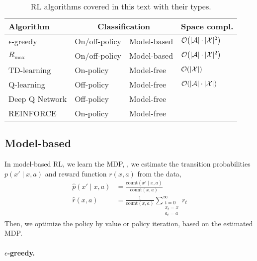 \begin{table}[t]
  \caption{RL algorithms covered in this text with their types.}
  \label{tab:rl-algos}
  \centering
  \begin{tabular}[c]{llll}
    \toprule
    \textbf{Algorithm} & \multicolumn{2}{c}{\textbf{Classification}} & \textbf{Space compl.} \\
    \midrule
    $\epsilon$-greedy & On/off-policy & Model-based & $\bigo{|\mathcal{A}| \cdot |\X|^2}$ \\
    $R_{\max}$ & On/off-policy & Model-based & $\bigo{|\mathcal{A}| \cdot |\X|^2}$ \\
    TD-learning & On-policy & Model-free & $\bigo{|\X|}$ \\
    Q-learning & Off-policy & Model-free & $\bigo{|\mathcal{A}| \cdot |\X|}$ \\
    Deep Q Network & Off-policy & Model-free \\
    REINFORCE & On-policy & Model-free \\
    \bottomrule
  \end{tabular}
\end{table}

\subsection{Model-based}

In model-based RL, we learn the MDP, \ie, we estimate the transition
probabilities $p(x'\mid x,a)$ and reward function $r(x,a)$ from the data,
\begin{align*}
  \hat{p}(x'\mid x, a) &= \frac{\mathrm{count}(x' \mid x, a)}{\mathrm{count}(x, a)} \\
  \hat{r}(x, a) &= \frac{1}{\mathrm{count}(x,a)} \sum_{\substack{t=0 \\ x_t = x \\ a_t = a}}^\infty r_t
\end{align*}
Then, we optimize the policy by value or policy iteration, based on the
estimated MDP.

\paragraph{$\epsilon$-greedy.}


